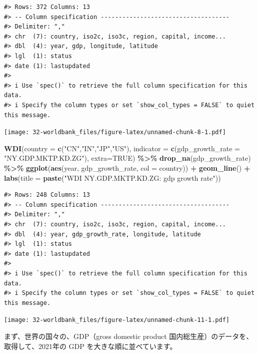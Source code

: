 \documentclass[
  xelatex, ja=standard]{bxjsbook}
\newenvironment{Shaded}{\begin{snugshade}}{\end{snugshade}}
\newcommand{\AttributeTok}[1]{\textcolor[rgb]{0.13,0.29,0.53}{#1}}
\newcommand{\ConstantTok}[1]{\textcolor[rgb]{0.56,0.35,0.01}{#1}}
\newcommand{\FunctionTok}[1]{\textcolor[rgb]{0.13,0.29,0.53}{\textbf{#1}}}
\newcommand{\NormalTok}[1]{#1}
\newcommand{\SpecialCharTok}[1]{\textcolor[rgb]{0.81,0.36,0.00}{\textbf{#1}}}
\newcommand{\StringTok}[1]{\textcolor[rgb]{0.31,0.60,0.02}{#1}}
\theoremstyle{definition}
\theoremstyle{definition}
\theoremstyle{definition}
\theoremstyle{definition}
\theoremstyle{remark}
\begin{document}
\begin{verbatim}
#> Rows: 372 Columns: 13
#> -- Column specification ------------------------------------
#> Delimiter: ","
#> chr  (7): country, iso2c, iso3c, region, capital, income...
#> dbl  (4): year, gdp, longitude, latitude
#> lgl  (1): status
#> date (1): lastupdated
#> 
#> i Use `spec()` to retrieve the full column specification for this data.
#> i Specify the column types or set `show_col_types = FALSE` to quiet this message.
\end{verbatim}

\texttt{[image: 32-worldbank\_files/figure-latex/unnamed-chunk-8-1.pdf]}

\begin{Shaded}
\begin{Highlighting}[]
\FunctionTok{WDI}\NormalTok{(}\AttributeTok{country =} \FunctionTok{c}\NormalTok{(}\StringTok{"CN"}\NormalTok{,}\StringTok{"IN"}\NormalTok{,}\StringTok{"JP"}\NormalTok{,}\StringTok{"US"}\NormalTok{), }
    \AttributeTok{indicator =} \FunctionTok{c}\NormalTok{(}\AttributeTok{gdp\_growth\_rate =} \StringTok{"NY.GDP.MKTP.KD.ZG"}\NormalTok{), }\AttributeTok{extra=}\ConstantTok{TRUE}\NormalTok{) }\SpecialCharTok{\%\textgreater{}\%}
  \FunctionTok{drop\_na}\NormalTok{(gdp\_growth\_rate) }\SpecialCharTok{\%\textgreater{}\%} 
  \FunctionTok{ggplot}\NormalTok{(}\FunctionTok{aes}\NormalTok{(year, gdp\_growth\_rate, }\AttributeTok{col =}\NormalTok{ country)) }\SpecialCharTok{+} \FunctionTok{geom\_line}\NormalTok{() }\SpecialCharTok{+}
  \FunctionTok{labs}\NormalTok{(}\AttributeTok{title =} \FunctionTok{paste}\NormalTok{(}\StringTok{"WDI NY.GDP.MKTP.KD.ZG: gdp growth rate"}\NormalTok{))}
\end{Highlighting}
\end{Shaded}

\begin{verbatim}
#> Rows: 248 Columns: 13
#> -- Column specification ------------------------------------
#> Delimiter: ","
#> chr  (7): country, iso2c, iso3c, region, capital, income...
#> dbl  (4): year, gdp_growth_rate, longitude, latitude
#> lgl  (1): status
#> date (1): lastupdated
#> 
#> i Use `spec()` to retrieve the full column specification for this data.
#> i Specify the column types or set `show_col_types = FALSE` to quiet this message.
\end{verbatim}

\texttt{[image: 32-worldbank\_files/figure-latex/unnamed-chunk-11-1.pdf]}

まず、世界の国々の、GDP（gross domestic product 国内総生産）のデータを、取得して、2021年の GDP を大きな順に並べています。
\end{document}
